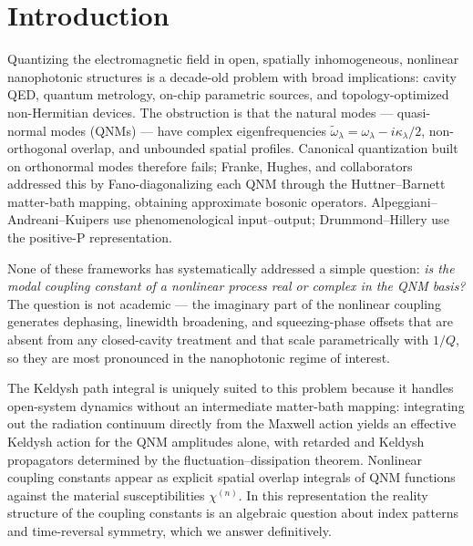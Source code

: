 \documentclass[11pt]{article}
\newcommand{\tomega}{\tilde{\omega}}
\begin{document}
\tableofcontents

\section{Introduction}
\label{sec:intro}

Quantizing the electromagnetic field in open, spatially inhomogeneous,
nonlinear nanophotonic structures is a decade-old problem with broad
implications: cavity QED, quantum metrology, on-chip parametric sources,
and topology-optimized non-Hermitian devices.  The obstruction is that
the natural modes --- quasi-normal modes (QNMs)
\cite{Lalanne2018,Kristensen2015} --- have complex eigenfrequencies
$\tomega_\lambda=\omega_\lambda-i\kappa_\lambda/2$, non-orthogonal
overlap, and unbounded spatial profiles.  Canonical quantization built
on orthonormal modes therefore fails; Franke, Hughes, and collaborators
\cite{Franke2019,Ren2021,Franke2020} addressed this by Fano-diagonalizing
each QNM through the Huttner--Barnett matter-bath mapping, obtaining
approximate bosonic operators.  Alpeggiani--Andreani--Kuipers
\cite{Alpeggiani2015,Alpeggiani2017} use phenomenological input--output;
Drummond--Hillery \cite{Drummond1980,DrummondHillery2014} use the
positive-P representation.

None of these frameworks has systematically addressed a simple question:
\emph{is the modal coupling constant of a nonlinear process real or
complex in the QNM basis?}  The question is not academic --- the
imaginary part of the nonlinear coupling generates dephasing, linewidth
broadening, and squeezing-phase offsets that are absent from any
closed-cavity treatment and that scale parametrically with $1/Q$, so
they are most pronounced in the nanophotonic regime of interest.

The Keldysh path integral is uniquely suited to this problem because
it handles open-system dynamics without an intermediate matter-bath
mapping: integrating out the radiation continuum directly from the
Maxwell action yields an effective Keldysh action for the QNM
amplitudes alone, with retarded and Keldysh propagators determined
by the fluctuation--dissipation theorem.  Nonlinear coupling constants
appear as explicit spatial overlap integrals of QNM functions against
the material susceptibilities $\chi^{(n)}$.  In this representation
the reality structure of the coupling constants is an algebraic
question about index patterns and time-reversal symmetry, which we
answer definitively.
\end{document}
